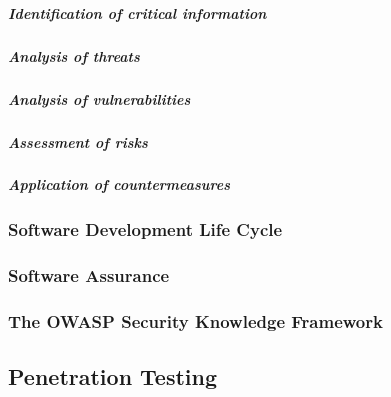 \subparagraph{Identification of critical information}

\subparagraph{Analysis of threats}

\subparagraph{Analysis of vulnerabilities}

\subparagraph{Assessment of risks}

\subparagraph{Application of countermeasures}

\subsubsection{Software Development Life Cycle}

\subsubsection{Software Assurance}
\subsubsection{The OWASP Security Knowledge Framework}

\subsection{Penetration Testing}
